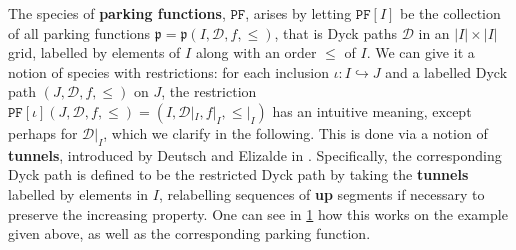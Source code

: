 \documentclass[12pt, reqno]{amsart}
\theoremstyle{definition}
\begin{document}
The species of \textbf{parking functions}, $\mathtt{PF}$, arises by letting $\mathtt{PF}[I]$ be the collection of all parking functions $\mathfrak{p} = \mathfrak{p}(I, \mathcal D, f, \leq)$, that is Dyck paths $\mathcal D$ in an $|I|\times |I|$ grid, labelled by elements of $I$ along with an order $\leq$ of $I$.
We can give it a notion of species with restrictions: for each inclusion $\iota : I \hookrightarrow J $ and a labelled Dyck path $(J, \mathcal D, f, \leq)$ on $J$, the restriction $\mathtt{PF}[\iota](J, \mathcal D, f, \leq) = (I, \mathcal D|_I, f|_I, \leq|_I)$ has an intuitive meaning, except perhaps for
$\mathcal D|_I$, which we clarify in the following.
This is done via a notion of \textbf{tunnels}, introduced by Deutsch and Elizalde in \cite{elizalde2003simple}.
Specifically, the corresponding Dyck path is defined to be the restricted Dyck path by taking the \textbf{tunnels} labelled by elements in $I$, relabelling sequences of \textbf{up} segments if necessary to preserve the increasing property.
One can see in \cref{fig:restriction_parking} how this works on the example given above, as well as the corresponding parking function.


\begin{figure}[h]
\centering
    \qquad
    \caption{\label{fig:restriction_parking}}%
\end{figure}
\end{document}
